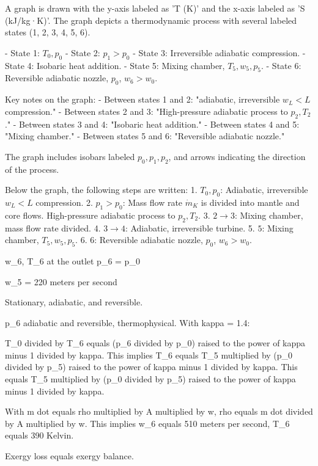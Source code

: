 A graph is drawn with the y-axis labeled as 'T (K)' and the x-axis labeled as 'S (kJ/kg·K)'. The graph depicts a thermodynamic process with several labeled states (1, 2, 3, 4, 5, 6).  

- State 1: \( T_0, p_0 \)  
- State 2: \( p_1 > p_0 \)  
- State 3: Irreversible adiabatic compression.  
- State 4: Isobaric heat addition.  
- State 5: Mixing chamber, \( T_5, w_5, p_5 \).  
- State 6: Reversible adiabatic nozzle, \( p_0 \), \( w_6 > w_0 \).  

Key notes on the graph:  
- Between states 1 and 2: "adiabatic, irreversible \( w_L < L \) compression."  
- Between states 2 and 3: "High-pressure adiabatic process to \( p_2, T_2 \)."  
- Between states 3 and 4: "Isobaric heat addition."  
- Between states 4 and 5: "Mixing chamber."  
- Between states 5 and 6: "Reversible adiabatic nozzle."  

The graph includes isobars labeled \( p_0, p_1, p_2 \), and arrows indicating the direction of the process.  

Below the graph, the following steps are written:  
1. \( T_0, p_0 \): Adiabatic, irreversible \( w_L < L \) compression.  
2. \( p_1 > p_0 \): Mass flow rate \( \dot{m}_K \) is divided into mantle and core flows. High-pressure adiabatic process to \( p_2, T_2 \).  
3. \( 2 \rightarrow 3 \): Mixing chamber, mass flow rate divided.  
4. \( 3 \rightarrow 4 \): Adiabatic, irreversible turbine.  
5. \( 5 \): Mixing chamber, \( T_5, w_5, p_5 \).  
6. \( 6 \): Reversible adiabatic nozzle, \( p_0 \), \( w_6 > w_0 \).

w_6, T_6 at the outlet  
p_6 = p_0  

w_5 = 220 meters per second  

Stationary, adiabatic, and reversible.  

p_6 adiabatic and reversible, thermophysical. With kappa = 1.4:  

T_0 divided by T_6 equals (p_6 divided by p_0) raised to the power of kappa minus 1 divided by kappa.  
This implies T_6 equals T_5 multiplied by (p_0 divided by p_5) raised to the power of kappa minus 1 divided by kappa.  
This equals T_5 multiplied by (p_0 divided by p_5) raised to the power of kappa minus 1 divided by kappa.  

With m dot equals rho multiplied by A multiplied by w, rho equals m dot divided by A multiplied by w.  
This implies w_6 equals 510 meters per second, T_6 equals 390 Kelvin.

Exergy loss equals exergy balance.  

